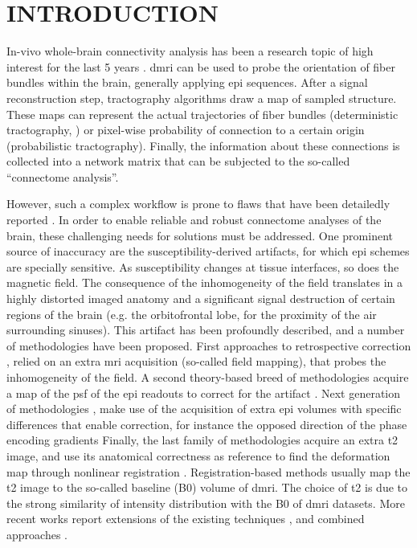 \section{INTRODUCTION}

In-vivo whole-brain connectivity analysis has been a
research topic of high interest for the last
5 years \cite{jones_studying_2008}. 
\Gls*{dmri} can be used to probe the
orientation of fiber bundles within the brain,
generally applying \gls*{epi} sequences.
After a signal reconstruction step, tractography
algorithms draw a map of sampled structure.
These maps can represent the actual trajectories
of fiber bundles (deterministic tractography,
\cite{basser_microstructural_2011}) or pixel-wise
probability of connection to a certain origin
(probabilistic tractography). Finally, the
information about these connections is collected
into a network matrix that can be subjected to
the so-called ``connectome analysis''.

However, such a complex workflow is prone to
flaws that have been detailedly reported 
\cite{jones_twenty-five_2010,jbabdi_tractography:_2011}.
In order to enable reliable and robust connectome
analyses of the brain, these challenging needs for
solutions must be addressed. One prominent source
of inaccuracy are the susceptibility-derived artifacts,
for which \Gls*{epi} schemes are specially sensitive.
As susceptibility changes at tissue interfaces,
so does the magnetic field. The consequence of the 
inhomogeneity of the field translates in a highly 
distorted imaged anatomy and a significant signal 
destruction of certain regions of the brain 
(e.g. the orbitofrontal lobe, for the proximity of the
air surrounding sinuses). This artifact has been
profoundly described, and a number of methodologies
have been proposed. First approaches to
retrospective correction \cite{jezzard_correction_1995},
relied on an extra \gls*{mri} acquisition (so-called
field mapping), that probes the inhomogeneity of the field.
A second theory-based breed of methodologies acquire a 
map of the \gls*{psf} of the \gls*{epi} readouts to correct 
for the artifact \cite{robson_measurement_1997}. 
Next generation of methodologies \cite{cordes_geometric_2000,
chiou_simple_2000}, make use of the acquisition of 
extra \gls*{epi} volumes 
with specific differences that enable correction, for instance
the opposed direction of the phase encoding gradients 
Finally, the last family of methodologies acquire an 
extra \gls*{t2} image, and use its anatomical correctness 
as reference to find the deformation map through nonlinear 
registration \cite{kybic_unwarping_2000,studholme_accurate_2000}.
Registration-based methods usually map
the \gls*{t2} image to the so-called baseline (B0) volume 
of \gls*{dmri}. The choice of \gls*{t2} is due to the strong
similarity of intensity distribution with the B0 of \gls*{dmri}
datasets. More recent works report extensions of the existing
techniques \cite{andersson_how_2003,holland_efficient_2010,
andersson_comprehensive_2012}, and combined approaches
\cite{zaitsev_point_2004}.

